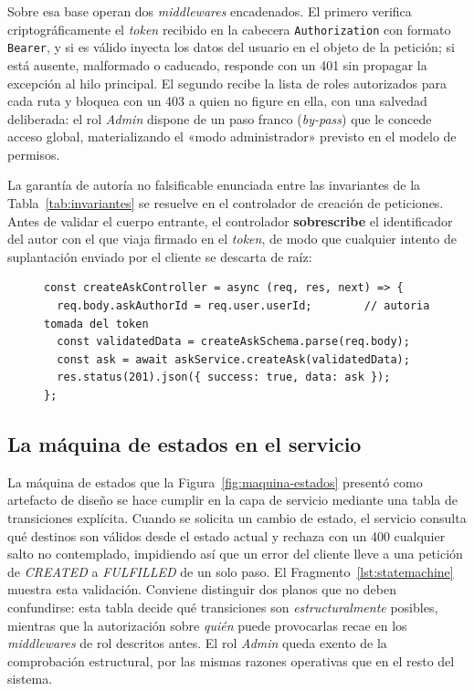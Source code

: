 \documentclass[11pt,oneside,spanish,listoffigures,listoftables]{tfgetsinf}
\begin{document}
Sobre esa base operan dos \textit{middlewares} encadenados. El primero verifica criptográficamente el \textit{token} recibido en la cabecera \texttt{Authorization} con formato \texttt{Bearer}, y si es válido inyecta los datos del usuario en el objeto de la petición; si está ausente, malformado o caducado, responde con un 401 sin propagar la excepción al hilo principal. El segundo recibe la lista de roles autorizados para cada ruta y bloquea con un 403 a quien no figure en ella, con una salvedad deliberada: el rol \textit{Admin} dispone de un paso franco (\textit{by-pass}) que le concede acceso global, materializando el «modo administrador» previsto en el modelo de permisos.

La garantía de autoría no falsificable enunciada entre las invariantes de la Tabla~\ref{tab:invariantes} se resuelve en el controlador de creación de peticiones. Antes de validar el cuerpo entrante, el controlador \textbf{sobrescribe} el identificador del autor con el que viaja firmado en el \textit{token}, de modo que cualquier intento de suplantación enviado por el cliente se descarta de raíz:

\begin{figure}[htbp]
\begin{lstlisting}[caption={Asignación de la autoría a partir del token, descartando el identificador que enviase el cliente.}, label={lst:antispoofing}]
const createAskController = async (req, res, next) => {
  req.body.askAuthorId = req.user.userId;        // autoria tomada del token
  const validatedData = createAskSchema.parse(req.body);
  const ask = await askService.createAsk(validatedData);
  res.status(201).json({ success: true, data: ask });
};
\end{lstlisting}
\end{figure}

\subsection{La máquina de estados en el servicio}

La máquina de estados que la Figura~\ref{fig:maquina-estados} presentó como artefacto de diseño se hace cumplir en la capa de servicio mediante una tabla de transiciones explícita. Cuando se solicita un cambio de estado, el servicio consulta qué destinos son válidos desde el estado actual y rechaza con un 400 cualquier salto no contemplado, impidiendo así que un error del cliente lleve a una petición de \textit{CREATED} a \textit{FULFILLED} de un solo paso. El Fragmento~\ref{lst:statemachine} muestra esta validación. Conviene distinguir dos planos que no deben confundirse: esta tabla decide qué transiciones son \textit{estructuralmente} posibles, mientras que la autorización sobre \textit{quién} puede provocarlas recae en los \textit{middlewares} de rol descritos antes. El rol \textit{Admin} queda exento de la comprobación estructural, por las mismas razones operativas que en el resto del sistema.
\end{document}
